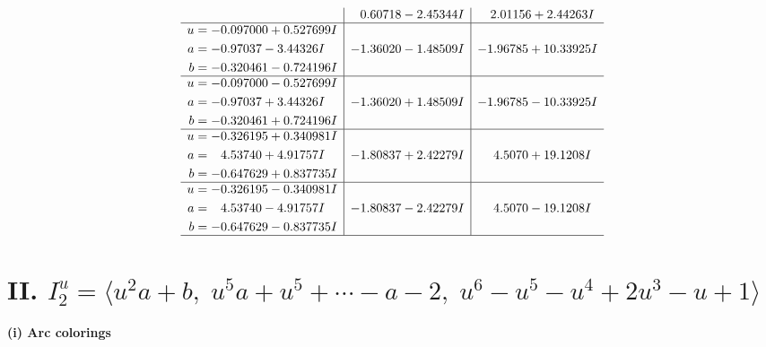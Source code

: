 \documentclass[1p]{elsarticle_modified}
\theoremstyle{definition}
\begin{document}
$$\begin{array}{c|c|c}
 & \phantom{-}0.60718 - 2.45344 I & \phantom{-}2.01156 + 2.44263 I \\ \hline\begin{aligned}
u &= -0.097000 + 0.527699 I \\
a &= -0.97037 - 3.44326 I \\
b &= -0.320461 - 0.724196 I\end{aligned}
 & -1.36020 - 1.48509 I & -1.96785 + 10.33925 I \\ \hline\begin{aligned}
u &= -0.097000 - 0.527699 I \\
a &= -0.97037 + 3.44326 I \\
b &= -0.320461 + 0.724196 I\end{aligned}
 & -1.36020 + 1.48509 I & -1.96785 - 10.33925 I \\ \hline\begin{aligned}
u &= -0.326195 + 0.340981 I \\
a &= \phantom{-}4.53740 + 4.91757 I \\
b &= -0.647629 + 0.837735 I\end{aligned}
 & -1.80837 + 2.42279 I & \phantom{-}4.5070 + 19.1208 I \\ \hline\begin{aligned}
u &= -0.326195 - 0.340981 I \\
a &= \phantom{-}4.53740 - 4.91757 I \\
b &= -0.647629 - 0.837735 I\end{aligned}
 & -1.80837 - 2.42279 I & \phantom{-}4.5070 - 19.1208 I\\
 \hline 
 \end{array}$$\newpage\newpage\renewcommand{\arraystretch}{1}
\centering \section*{II. $I^u_{2}= \langle u^2 a+b,\;u^5 a+u^5+\cdots- a-2,\;u^6- u^5- u^4+2 u^3- u+1 \rangle$}
\flushleft \textbf{(i) Arc colorings}\\
\end{document}
